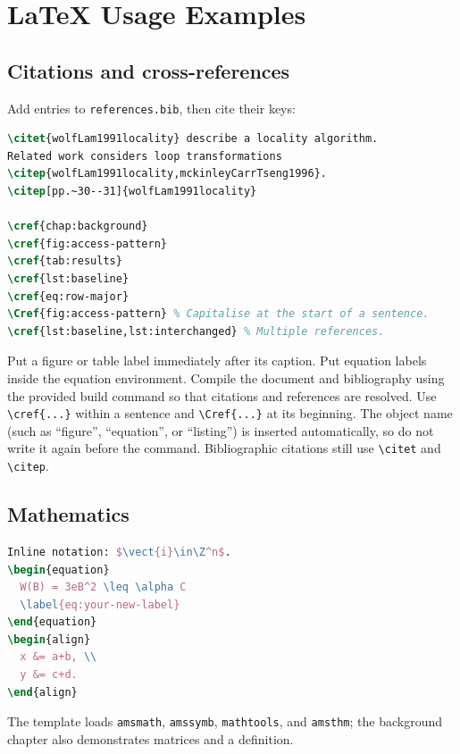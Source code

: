 \chapter{LaTeX Usage Examples}
\label{app:latex}

\section{Citations and cross-references}
Add entries to \texttt{references.bib}, then cite their keys:
\begin{lstlisting}[language=TeX,numbers=none]
\citet{wolfLam1991locality} describe a locality algorithm.
Related work considers loop transformations
\citep{wolfLam1991locality,mckinleyCarrTseng1996}.
\citep[pp.~30--31]{wolfLam1991locality}

\cref{chap:background}
\cref{fig:access-pattern}
\cref{tab:results}
\cref{lst:baseline}
\cref{eq:row-major}
\Cref{fig:access-pattern} % Capitalise at the start of a sentence.
\cref{lst:baseline,lst:interchanged} % Multiple references.
\end{lstlisting}
Put a figure or table label immediately after its caption. Put equation labels
inside the equation environment. Compile the document and bibliography using
the provided build command so that citations and references are resolved.
Use \verb|\cref{...}| within a sentence and \verb|\Cref{...}| at its beginning.
The object name (such as ``figure'', ``equation'', or ``listing'') is inserted
automatically, so do not write it again before the command. Bibliographic
citations still use \verb|\citet| and \verb|\citep|.

\section{Mathematics}
\begin{lstlisting}[language=TeX,numbers=none]
Inline notation: $\vect{i}\in\Z^n$.
\begin{equation}
  W(B) = 3eB^2 \leq \alpha C
  \label{eq:your-new-label}
\end{equation}
\begin{align}
  x &= a+b, \\
  y &= c+d.
\end{align}
\end{lstlisting}
The template loads \texttt{amsmath}, \texttt{amssymb}, \texttt{mathtools}, and
\texttt{amsthm}; the background chapter also demonstrates matrices and a definition.

